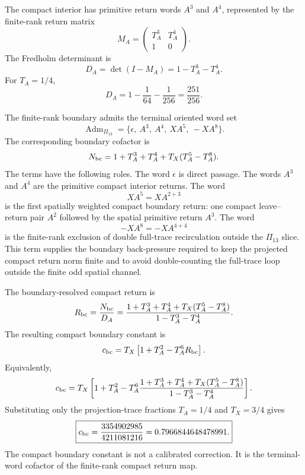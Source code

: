 \documentclass[11pt]{article}
\begin{document}
The compact interior has primitive return words \(A^3\) and \(A^4\), represented
by the finite-rank return matrix
\begin{equation}
M_A
=
\begin{pmatrix}
T_A^3&T_A^4\\
1&0
\end{pmatrix}.
\end{equation}
The Fredholm determinant is
\begin{equation}
D_A
=
\det(I-M_A)
=
1-T_A^3-T_A^4.
\end{equation}
For \(T_A=1/4\),
\begin{equation}
D_A
=
1-\frac1{64}-\frac1{256}
=
\frac{251}{256}.
\end{equation}

The finite-rank boundary admits the terminal oriented word set
\begin{equation}
\boxed{
\operatorname{Adm}_{\Pi_{13}}
=
\{\epsilon,\ A^3,\ A^4,\ XA^5,\ -XA^8\}.
}
\end{equation}
The corresponding boundary cofactor is
\begin{equation}
N_{\rm bc}
=
1+T_A^3+T_A^4+T_X(T_A^5-T_A^8).
\end{equation}
The terms have the following roles. The word \(\epsilon\) is direct passage. The
words \(A^3\) and \(A^4\) are the primitive compact interior returns. The word
\begin{equation}
XA^5=XA^{2+3}
\end{equation}
is the first spatially weighted compact boundary return: one compact
leave--return pair \(A^2\) followed by the spatial primitive return \(A^3\). The
word
\begin{equation}
-XA^8=-XA^{4+4}
\end{equation}
is the finite-rank exclusion of double full-trace recirculation outside the
\(\Pi_{13}\) slice. This term supplies the boundary back-pressure required to
keep the projected compact return norm finite and to avoid double-counting the
full-trace loop outside the finite odd spatial channel.

The boundary-resolved compact return is
\begin{equation}
R_{\rm bc}
=
\frac{N_{\rm bc}}{D_A}
=
\frac{
1+T_A^3+T_A^4+T_X(T_A^5-T_A^8)
}{
1-T_A^3-T_A^4
}.
\end{equation}
The resulting compact boundary constant is
\begin{equation}
c_{\rm bc}
=
T_X
\left[
1+T_A^2
-
T_A^6R_{\rm bc}
\right].
\end{equation}
Equivalently,
\begin{equation}
c_{\rm bc}
=
T_X
\left[
1+T_A^2
-
T_A^6
\frac{
1+T_A^3+T_A^4+T_X(T_A^5-T_A^8)
}{
1-T_A^3-T_A^4
}
\right].
\end{equation}
Substituting only the projection-trace fractions \(T_A=1/4\) and \(T_X=3/4\)
gives
\begin{equation}
\boxed{
c_{\rm bc}
=
\frac{3354902985}{4211081216}
=
0.7966844648478991.
}
\end{equation}
The compact boundary constant is not a calibrated correction. It is the
terminal-word cofactor of the finite-rank compact return map.
\end{document}

